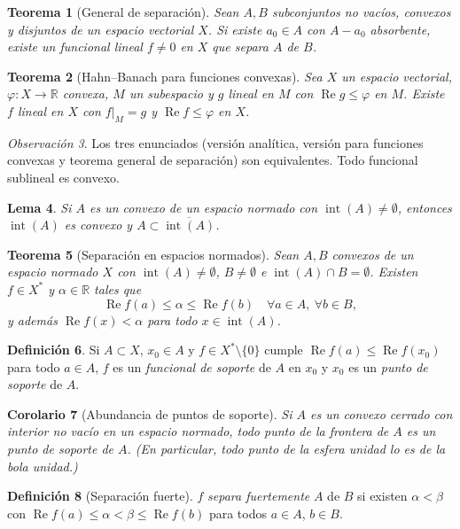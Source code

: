 \documentclass[11pt,a4paper]{article}
\newcommand{\R}{\mathbb{R}}
\renewcommand{\Re}{\operatorname{Re}}
\newcommand{\inter}{\operatorname{int}}
\theoremstyle{plain}
\newtheorem{teorema}{Teorema}[section]
\newtheorem{lema}[teorema]{Lema}
\newtheorem{corolario}[teorema]{Corolario}
\theoremstyle{definition}
\newtheorem{definicion}[teorema]{Definición}
\theoremstyle{remark}
\newtheorem{observacion}[teorema]{Observación}
\begin{document}
\begin{teorema}[General de separación]
Sean $A,B$ subconjuntos no vacíos, convexos y disjuntos de un espacio vectorial $X$. Si existe $a_0\in A$ con $A-a_0$ absorbente, existe un funcional lineal $f\neq0$ en $X$ que separa $A$ de $B$.
\end{teorema}

\begin{teorema}[Hahn--Banach para funciones convexas]
Sea $X$ un espacio vectorial, $\varphi:X\to\R$ convexa, $M$ un subespacio y $g$ lineal en $M$ con $\Re g\le\varphi$ en $M$. Existe $f$ lineal en $X$ con $f|_M=g$ y $\Re f\le\varphi$ en $X$.
\end{teorema}

\begin{observacion}
Los tres enunciados (versión analítica, versión para funciones convexas y teorema general de separación) son equivalentes. Todo funcional sublineal es convexo.
\end{observacion}

\begin{lema}
Si $A$ es un convexo de un espacio normado con $\inter(A)\neq\emptyset$, entonces $\inter(A)$ es convexo y $A\subset\overline{\inter(A)}$.
\end{lema}

\begin{teorema}[Separación en espacios normados]
Sean $A,B$ convexos de un espacio normado $X$ con $\inter(A)\neq\emptyset$, $B\neq\emptyset$ e $\inter(A)\cap B=\emptyset$. Existen $f\in X^*$ y $\alpha\in\R$ tales que
\[
\Re f(a)\le\alpha\le\Re f(b)\quad\forall a\in A,\ \forall b\in B,
\]
y además $\Re f(x)<\alpha$ para todo $x\in\inter(A)$.
\end{teorema}

\begin{definicion}
Si $A\subset X$, $x_0\in A$ y $f\in X^*\setminus\{0\}$ cumple $\Re f(a)\le\Re f(x_0)$ para todo $a\in A$, $f$ es un \emph{funcional de soporte} de $A$ en $x_0$ y $x_0$ es un \emph{punto de soporte} de $A$.
\end{definicion}

\begin{corolario}[Abundancia de puntos de soporte]
Si $A$ es un convexo cerrado con interior no vacío en un espacio normado, todo punto de la frontera de $A$ es un punto de soporte de $A$. (En particular, todo punto de la esfera unidad lo es de la bola unidad.)
\end{corolario}

\begin{definicion}[Separación fuerte]
$f$ \emph{separa fuertemente} $A$ de $B$ si existen $\alpha<\beta$ con $\Re f(a)\le\alpha<\beta\le\Re f(b)$ para todos $a\in A$, $b\in B$.
\end{definicion}
\end{document}
